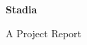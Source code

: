 \begin{titlepage}
\begin{center}
		\begin{LARGE}
			\bf{Stadia}
		\end{LARGE}
		\vspace*{30pt}
		
		{\large A Project Report}
		\vspace{3.5\baselineskip}	
		
		
		\vspace{15pt}
	
	\end{center}
\end{titlepage}